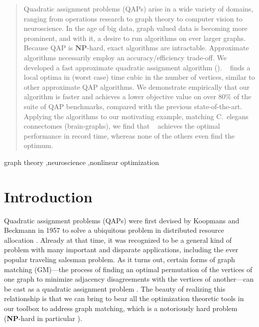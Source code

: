\documentclass[preprint,11pt]{elsarticle}
\begin{document}
\begin{frontmatter}
\begin{abstract}
Quadratic assignment problems (QAPs) arise in a wide variety of domains, ranging from operations research to graph theory to computer vision to neuroscience.  In the age of big data, graph valued data is becoming more prominent, and with it, a desire to run algorithms on ever larger graphs.  Because QAP is \textbf{NP}-hard, exact algorithms are intractable.  Approximate algorithms necessarily employ an accuracy/efficiency trade-off. We developed a fast approximate quadratic assignment algorithm (\FAQ). \FAQ~ finds a local optima in (worst case) time cubic in the number of vertices, similar to other approximate QAP algorithms.  We demonstrate empirically that our algorithm is faster and achieves a lower objective value on over $80\%$ of the suite of QAP benchmarks, compared with the previous state-of-the-art.  Applying the algorithms to our motivating example, matching C.~elegans connectomes (brain-graphs), we find that \FAQ~ achieves the optimal performance in record time, whereas none of the others even find the optimum.
\end{abstract}

\begin{keyword}

graph theory \sep neuroscience \sep nonlinear optimization


\end{keyword}


\end{frontmatter}



\newpage
\section{Introduction}

Quadratic assignment problems (QAPs) were first devised by Koopmans and Beckmann in 1957 to solve a ubiquitous problem in distributed resource allocation \cite{Koopmans1957}. 
Already at that time, it was recognized to be a general kind of problem with many important and disparate applications, including the ever popular traveling salesman problem.  As it turns out, certain forms of graph matching (GM)---the process of finding an optimal permutation of the vertices of one graph to minimize adjacency disagreements with the vertices of another---can be cast as a quadratic assignment problem \cite{Umeyama1988}. The beauty of realizing this relationship is that we can bring to bear all the optimization theoretic tools in our toolbox to address graph matching, which is a notoriously hard problem (\textbf{NP}-hard in particular \cite{Papadimitriou1998}).
\end{document}
